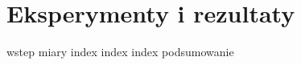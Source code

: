 \newcommand*{\resultssummary}[1]{
  Rezultaty oznaczają, że sieć rozważana w tym punkcie rozpoznaje poprawnie średnio \textbf{#1\%} pikseli na obrazie.
}
\newcommand{\resultsoriginal}{bazowej implementacji sieci \textit{Mask R-CNN}}
\newcommand{\resultsmodified}{zmodyfikowanej implementacji sieci \textit{Mask R-CNN}}
\newcommand{\withgenerated}{, wzbogaconym o sztucznie wygenerowane obrazy treningowe}
\newcommand*{\resultsintro}[3]{W tym punkcie przedstawiono rezultaty #1, trenowanej na zbiorze danych \textit{#2}#3.}

\chapter{Eksperymenty i rezultaty}
\label{sec:eksperymenty_rezultaty}
{wstep}
{miary}
{index}
{index}
\newpage
{index}
\newpage
{podsumowanie}
